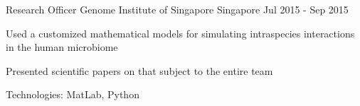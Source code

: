 \begin{cventries}
  \cventry
    {Research Officer} %
    {Genome Institute of Singapore} %
    {Singapore} %
    {Jul 2015 - Sep 2015} %
    {
      \begin{cvitems} %
        \item {Used a customized mathematical models for simulating intraspecies interactions in the human microbiome}
        \item {Presented scientific papers on that subject to the entire team}
        \item {Technologies: MatLab, Python}
      \end{cvitems}
    }

\end{cventries}

